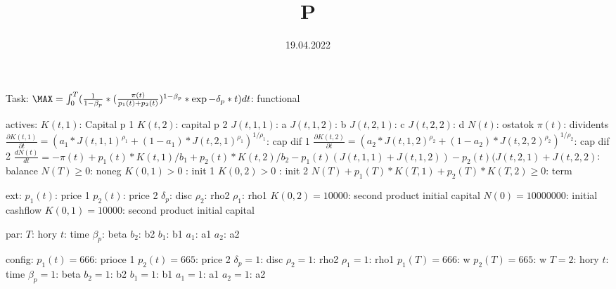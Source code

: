 \documentclass[12pt]{article}
\title{P}
\date{19.04.2022}
\begin{document}
Task:
    $\MAX = \int_0^T (\frac{1}{1-\beta_p} * (\frac{\pi(t)}{p_{1}(t) + p_{2}(t)})^{1-\beta_p} * \exp{-\delta_p * t})dt$: functional


actives:
    $K(t,1)$: Capital p 1
    $K(t,2)$: capital p 2
    $J(t,1,1)$: a
    $J(t,1,2)$: b
    $J(t,2,1)$: c
    $J(t,2,2)$: d
    $N(t)$: ostatok
    $\pi(t)$: dividents
    $\frac{\partial K(t,1)}{\partial t} = (a_{1} * J(t,1,1)^{\rho_{1}}+(1-a_{1}) * J(t,2,1)^{\rho_{1}})^{1 / \rho_{1}}$: cap dif 1
    $\frac{\partial K(t,2)}{\partial t} = (a_{2} * J(t,1,2)^{\rho_{2}}+(1-a_{2}) * J(t,2,2)^{\rho_{2}})^{1 / \rho_{2}}$: cap dif 2
    $\frac{dN(t)}{dt} = - \pi(t) + p_{1}(t)*K(t,1)/b_{1} + p_{2}(t)*K(t,2)/b_{2} - p_{1}(t)(J(t,1,1) + J(t,1,2)) - p_{2}(t)(J(t,2,1) + J(t,2,2)$: balance
    $N(T) \geq 0$: noneg
    $K(0,1) > 0$ : init 1
    $K(0,2) > 0$ : init 2
    $N(T) + p_{1}(T)*K(T,1) + p_{2}(T)*K(T,2) \geq 0 $: term

ext:
    $p_{1}(t)$: price 1
    $p_{2}(t)$: price 2
    $\delta_p$: disc
    $\rho_{2}$: rho2
    $\rho_{1}$: rho1
    $K(0, 2)=10000$: second product initial capital
    $N(0)=10000000$: initial cashflow
    $K(0, 1)=10000$: second product initial capital

par:
    $T$: hory
    $t$: time
    $\beta_p$: beta
    $b_{2}$: b2
    $b_{1}$: b1
    $a_{1}$: a1
    $a_{2}$: a2

config:
    $p_{1}(t)=666$: prioce 1
    $p_{2}(t)=665$: price 2
    $\delta_p=1$: disc
    $\rho_{2}=1$: rho2
    $\rho_{1}=1$: rho1
    $p_{1}(T)=666$: w
    $p_{2}(T)=665$: w
    $T=2$: hory
    $t$: time
    $\beta_p=1$: beta
    $b_{2}=1$: b2
    $b_{1}=1$: b1
    $a_{1}=1$: a1
    $a_{2}=1$: a2
\end{document}

